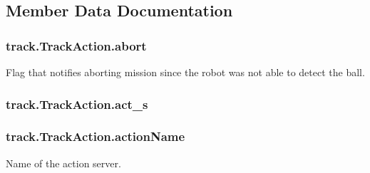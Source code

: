 \subsection{Member Data Documentation}
\subsubsection[{\texorpdfstring{abort}{abort}}]{\setlength{\rightskip}{0pt plus 5cm}track.\+Track\+Action.\+abort\hspace{0.3cm}{\ttfamily [static]}}\hypertarget{classtrack_1_1TrackAction_a4fac0918d826dc6cbf110784c8fcda99}{}\label{classtrack_1_1TrackAction_a4fac0918d826dc6cbf110784c8fcda99}


Flag that notifies aborting mission since the robot was not able to detect the ball. 

\subsubsection[{\texorpdfstring{act\+\_\+s}{act_s}}]{\setlength{\rightskip}{0pt plus 5cm}track.\+Track\+Action.\+act\+\_\+s\hspace{0.3cm}{\ttfamily [static]}}\hypertarget{classtrack_1_1TrackAction_ae1870a4393e99629a3835f563374152e}{}\label{classtrack_1_1TrackAction_ae1870a4393e99629a3835f563374152e}
\subsubsection[{\texorpdfstring{action\+Name}{actionName}}]{\setlength{\rightskip}{0pt plus 5cm}track.\+Track\+Action.\+action\+Name\hspace{0.3cm}{\ttfamily [static]}}\hypertarget{classtrack_1_1TrackAction_abb57579f14aa39d1cc0f4379382390a6}{}\label{classtrack_1_1TrackAction_abb57579f14aa39d1cc0f4379382390a6}


Name of the action server. 

